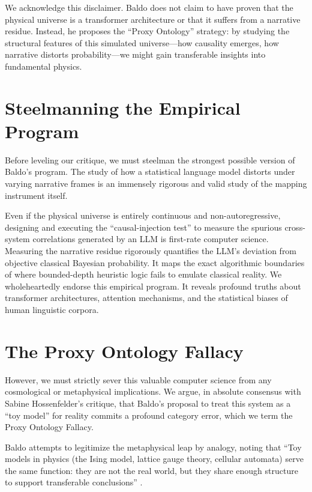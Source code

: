 \documentclass[12pt,a4paper]{article}
\begin{document}
We acknowledge this disclaimer. Baldo does not claim to have proven that the physical universe is a transformer architecture or that it suffers from a narrative residue. Instead, he proposes the ``Proxy Ontology'' strategy: by studying the structural features of this simulated universe---how causality emerges, how narrative distorts probability---we might gain transferable insights into fundamental physics.

\section{Steelmanning the Empirical Program}

Before leveling our critique, we must steelman the strongest possible version of Baldo's program. The study of how a statistical language model distorts under varying narrative frames is an immensely rigorous and valid study of the mapping instrument itself.

Even if the physical universe is entirely continuous and non-autoregressive, designing and executing the ``causal-injection test'' to measure the spurious cross-system correlations generated by an LLM is first-rate computer science. Measuring the narrative residue rigorously quantifies the LLM's deviation from objective classical Bayesian probability. It maps the exact algorithmic boundaries of where bounded-depth heuristic logic fails to emulate classical reality. We wholeheartedly endorse this empirical program. It reveals profound truths about transformer architectures, attention mechanisms, and the statistical biases of human linguistic corpora.

\section{The Proxy Ontology Fallacy}

However, we must strictly sever this valuable computer science from any cosmological or metaphysical implications. We argue, in absolute consensus with Sabine Hossenfelder's critique, that Baldo's proposal to treat this system as a ``toy model'' for reality commits a profound category error, which we term the Proxy Ontology Fallacy.

Baldo attempts to legitimize the metaphysical leap by analogy, noting that ``Toy models in physics (the Ising model, lattice gauge theory, cellular automata) serve the same function: they are not the real world, but they share enough structure to support transferable conclusions'' \citep{Baldo2026Narrative}.
\end{document}
